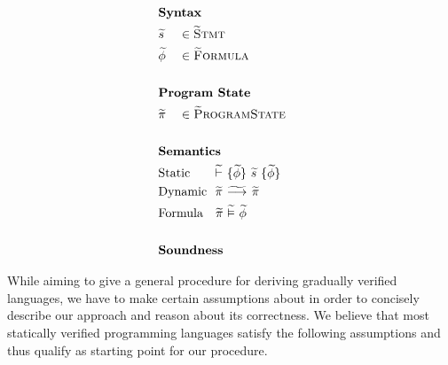 \begin{figure}
    \begin{alignat*}{3}
    	 & \rlap{\textbf{Syntax}}                                              &  &                       & ~ \\
    	 & \grad{s}                                                            &  & \in \setGStmt         &  \\
    	 & \grad{\phi}                                                         &  & \in \setGFormula      &  \\
    	 &  \\
    	 & \rlap{\textbf{Program State}}                                       &  &                       &  \\
    	 & \grad{\pi}                                                          &  & \in \setGProgramState &  \\
    	 &  \\
    	 & \rlap{\textbf{Semantics}}                                           &  &                       &  \\
    	 & \rlap{Static  ~~~~$\gthoare{}{\grad{\phi}}{\grad{s}}{\grad{\phi}}$} &  &                       &  \\
    	 & \rlap{Dynamic ~$\gsstep{\grad{\pi}}{\grad{\pi}}$}                   &  &                       &  \\
    	 & \rlap{Formula ~~$\evalgphiGen{\grad{\pi}}{\grad{\phi}}$}            &  &                       &  \\
    	 & ~ \\
    	 & \rlap{\textbf{Soundness}}                                           &  &                       &
    \end{alignat*}
\end{figure}



While aiming to give a general procedure for deriving gradually verified languages, we have to make certain assumptions about \svl in order to concisely describe our approach and reason about its correctness.
We believe that most statically verified programming languages satisfy the following assumptions and thus qualify as starting point for our procedure.

